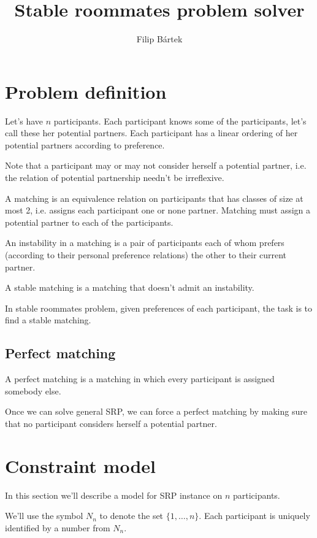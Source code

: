 \documentclass{article}
\begin{document}
\title{Stable roommates problem solver}
\author{Filip Bártek}
\maketitle

\section{Problem definition}

Let's have $n$ participants.
Each participant knows some of the participants,
let's call these her potential partners.
Each participant has a linear ordering of her potential partners according
to preference.

Note that a participant may or may not consider herself a potential partner,
i.e. the relation of potential partnership needn't be irreflexive.

A matching is an equivalence relation on participants that has classes of size
at most 2,
i.e. assigns each participant one or none partner.
Matching must assign a potential partner to each of the participants.

An instability in a matching is a pair of participants each of whom prefers (according to their personal preference relations) the other to their current partner.

A stable matching is a matching that doesn't admit an instability.

In stable roommates problem, given preferences of each participant,
the task is to find a stable matching.

\subsection{Perfect matching}
A perfect matching is a matching in which every participant is assigned somebody else.

Once we can solve general SRP,
we can force a perfect matching by making sure that no participant considers herself
a potential partner.

\section{Constraint model}
In this section we'll describe a model for SRP instance on $n$ participants.

We'll use the symbol $N_n$ to denote the set $\{1, \ldots, n\}$.
Each participant is uniquely identified by a number from $N_n$.
\end{document}
